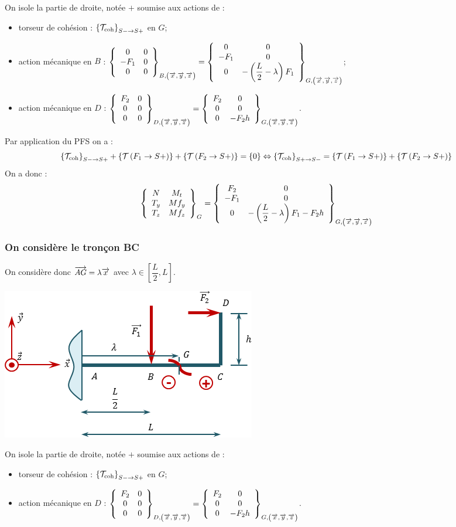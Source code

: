 \documentclass[10pt,fleqn]{article} %
\begin{document}
\begin{multicols}{2}
\begin{corrige}
On isole la partie de droite, notée $+$ soumise aux actions de :
\begin{itemize}[label=,font=\color{ocre}] 
\item torseur de cohésion : $\torseurscoh_{S-\rightarrow S+}$ en $G$;
\item action mécanique en $B$ : $\torseurcol{0}{-F_1}{0}{0}{0}{0}{B,\left( \vect{x},\vect{y},\vect{z} \right)}  =\torseurcol{0}{-F_1}{0}{0}{0}{-\left(\dfrac{L}{2}-\lambda \right)F_1}{G,\left( \vect{x},\vect{y},\vect{z} \right)} $;
\item action mécanique en $D$ : $\torseurcol{F_2}{0}{0}{0}{0}{0}{D,\left( \vect{x},\vect{y},\vect{z} \right)}  =\torseurcol{F_2}{0}{0}{0}{0}{-F_2h}{G,\left( \vect{x},\vect{y},\vect{z} \right)} $.
\end{itemize}


Par application du PFS on a : 
$$ \torseurscoh_{S-\rightarrow S+} +\torseurstat{T}{F_1}{S+} +\torseurstat{T}{F_2}{S+} = \{0\} \Leftrightarrow \torseurscoh_{S+\rightarrow S-} =\torseurstat{T}{F_1}{S+} +\torseurstat{T}{F_2}{S+}  $$
On a donc  :
$$
\torseurcol{N}{T_y}{T_z}{M_t}{Mf_y}{Mf_z}{G} = 
\torseurcol{F_2}{-F_1}{0}{0}{0}{-\left(\dfrac{L}{2}-\lambda \right)F_1-F_2h}{G,\left( \vect{x},\vect{y},\vect{z} \right)}
$$

\subsubsection*{On considère le tronçon BC}
On considère donc $\vect{AG} = \lambda \vect{x}$ avec $\lambda\in \left[\dfrac{L}{2},L\right]$.
\begin{center}
\includegraphics[width=.45\textwidth]{images/exo_08_corr_02}
\end{center}


On isole la partie de droite, notée $+$ soumise aux actions de :
\begin{itemize}[label=,font=\color{ocre}] 
\item torseur de cohésion : $\torseurscoh_{S-\rightarrow S+}$ en $G$;
\item action mécanique en $D$ : $\torseurcol{F_2}{0}{0}{0}{0}{0}{D,\left( \vect{x},\vect{y},\vect{z} \right)}  =\torseurcol{F_2}{0}{0}{0}{0}{-F_2h}{G,\left( \vect{x},\vect{y},\vect{z} \right)} $.
\end{itemize}



\end{corrige}
\end{multicols}
\end{document}
